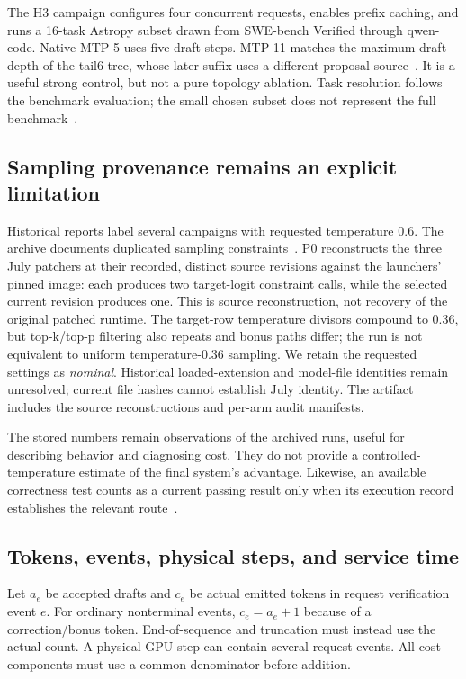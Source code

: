 \documentclass[conference]{IEEEtran}
\begin{document}
The H3 campaign configures four concurrent requests, enables prefix caching, and runs a 16-task Astropy subset drawn from SWE-bench Verified through qwen-code. Native MTP-5 uses five draft steps. MTP-11 matches the maximum draft depth of the tail6 tree, whose later suffix uses a different proposal source~\cite{lumo2026cost,lumo2026archive}. It is a useful strong control, but not a pure topology ablation. Task resolution follows the benchmark evaluation; the small chosen subset does not represent the full benchmark~\cite{jimenez2024swe}.

\subsection{Sampling provenance remains an explicit limitation}
Historical reports label several campaigns with requested temperature 0.6. The archive documents duplicated sampling constraints~\cite{lumo2026levers}. P0 reconstructs the three July patchers at their recorded, distinct source revisions against the launchers' pinned image: each produces two target-logit constraint calls, while the selected current revision produces one. This is source reconstruction, not recovery of the original patched runtime. The target-row temperature divisors compound to 0.36, but top-k/top-p filtering also repeats and bonus paths differ; the run is not equivalent to uniform temperature-0.36 sampling. We retain the requested settings as \emph{nominal}. Historical loaded-extension and model-file identities remain unresolved; current file hashes cannot establish July identity. The artifact includes the source reconstructions and per-arm audit manifests.

The stored numbers remain observations of the archived runs, useful for describing behavior and diagnosing cost. They do not provide a controlled-temperature estimate of the final system's advantage. Likewise, an available correctness test counts as a current passing result only when its execution record establishes the relevant route~\cite{lumo2026archive}.

\subsection{Tokens, events, physical steps, and service time}
Let $a_e$ be accepted drafts and $c_e$ be actual emitted tokens in request verification event $e$. For ordinary nonterminal events, $c_e=a_e+1$ because of a correction/bonus token. End-of-sequence and truncation must instead use the actual count. A physical GPU step can contain several request events. All cost components must use a common denominator before addition.
\end{document}
